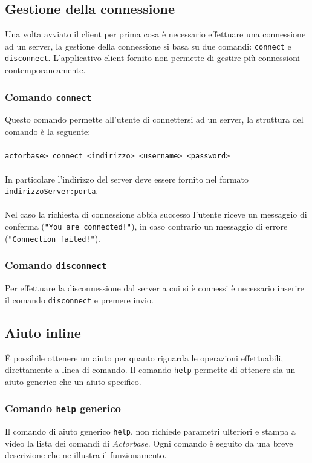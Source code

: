 \documentclass[a4paper]{article}
\begin{document}
	\subsection{Gestione della connessione}
	Una volta avviato il client per prima cosa è necessario effettuare una connessione ad un server, la gestione della connessione si basa su due comandi: \texttt{connect} e \texttt{disconnect}. L'applicativo client fornito non permette di gestire più connessioni contemporaneamente.
	
	\subsubsection{Comando \texttt{connect}}
	Questo comando permette all'utente di connettersi ad un server, la struttura del comando è la seguente:
	\\ \\
	\texttt{actorbase>	connect <indirizzo> <username> <password>}
	\\ \\
	In particolare l'indirizzo del server deve essere fornito nel formato \texttt{indirizzoServer:porta}. \\ \\
	Nel caso la richiesta di connessione abbia successo l'utente riceve un messaggio di conferma (\texttt{"You are connected!"}), in caso contrario un messaggio di errore (\texttt{"Connection failed!"}).
	
	\subsubsection{Comando \texttt{disconnect}}
	Per effettuare la disconnessione dal server a cui si è connessi è necessario inserire il comando \texttt{disconnect} e premere invio.
	

	\subsection{Aiuto inline}
	\'E possibile ottenere un aiuto per quanto riguarda le operazioni effettuabili, direttamente a linea di comando. Il comando \texttt{help} permette di ottenere sia un aiuto generico che un aiuto specifico.
	
	\subsubsection{Comando \texttt{help} generico}
	Il comando di aiuto generico \texttt{help}, non richiede parametri ulteriori e stampa a video la lista dei comandi di \emph{Actorbase}. Ogni comando è seguito da una breve descrizione che ne illustra il funzionamento.
	
\end{document}

